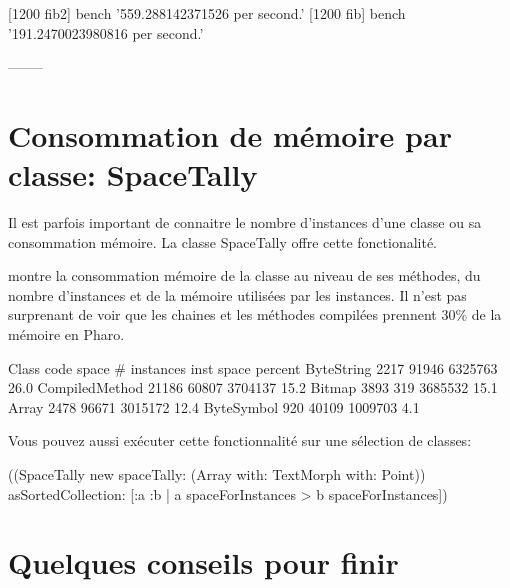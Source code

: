 \documentclass[a4paper,10pt,twoside]{book}
\begin{document}
\begin{code}{}
[1200 fib2] bench  '559.288142371526 per second.'
[1200 fib] bench  '191.2470023980816 per second.'
\end{code}



--------
\section{Consommation de m\'emoire par classe: SpaceTally}

Il est parfois important de connaitre le nombre d'instances d'une
classe ou sa consommation m\'emoire. La classe SpaceTally offre cette
fonctionalit\'e. 

 montre la consommation
m\'emoire de la classe au niveau de ses m\'ethodes, du nombre
d'instances et de la m\'emoire utilis\'ees par les instances. Il n'est pas
surprenant de voir que les chaines et les m\'ethodes compil\'ees
prennent 30\% de la m\'emoire en Pharo.

\begin{code}{}
Class                           code space # instances  inst space percent
ByteString                           2217       91946       6325763    26.0
CompiledMethod               21186       60807       3704137    15.2
Bitmap                                  3893         319       3685532    15.1
Array                                     2478       96671       3015172    12.4
ByteSymbol                        920       40109       1009703     4.1
\end{code}

Vous pouvez aussi ex\'ecuter cette fonctionnalit\'e sur une s\'election de classes: 
\begin{code}{}
((SpaceTally new spaceTally: (Array with: TextMorph with: Point)) 
	asSortedCollection: [:a :b | a spaceForInstances > b spaceForInstances]) 
\end{code}



\section{Quelques conseils pour finir}
\end{document}
